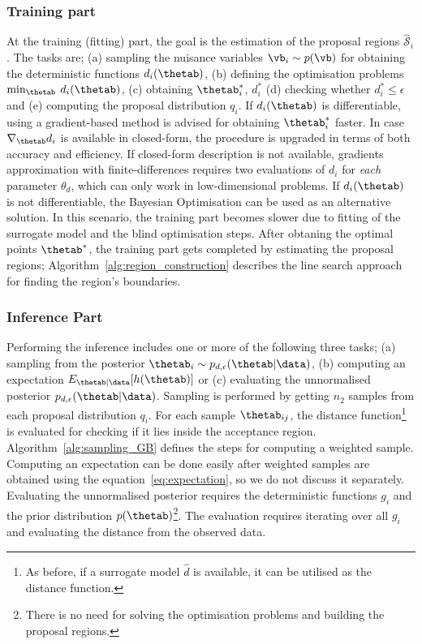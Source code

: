 \subsubsection*{Training part}
\noindent
At the training (fitting) part, the goal is the estimation of the
proposal regions $\mathcal{\hat{S}}_i$. The tasks are; (a) sampling
the nuisance variables $\vb_i \sim p(\vb)$ for obtaining the
deterministic functions $d_i(\thetab)$, (b) defining the optimisation
problems $\min_{\thetab} \: d_i(\thetab)$, (c) obtaining
$\thetab_i^*$, $d_i^*$ (d) checking whether $d_i^* \leq \epsilon$ and
(e) computing the proposal distribution $q_i$. If $d_i(\thetab)$ is
differentiable, using a gradient-based method is advised for obtaining
$\thetab_i^*$ faster. In case $\nabla_{\thetab} d_i$ is available in
closed-form, the procedure is upgraded in terms of both accuracy and
efficiency. If closed-form description is not available, gradients
approximation with finite-differences requires two evaluations of
$d_i$ for \emph{each} parameter $\theta_d$, which can only work in
low-dimensional problems. If $d_i(\thetab)$ is not differentiable, the
Bayesian Optimisation can be used as an alternative solution. In this
scenario, the training part becomes slower due to fitting of the
surrogate model and the blind optimisation steps. After obtaning the
optimal points $\thetab^*$, the training part gets completed by
estimating the proposal regions;
Algorithm~\ref{alg:region_construction} describes the line search
approach for finding the region's boundaries.

\subsubsection*{Inference Part}
Performing the inference includes one or more of the following three
tasks; (a) sampling from the posterior
$ \thetab_i \sim p_{d, \epsilon}(\thetab|\data)$, (b) computing an
expectation $E_{\thetab|\data}[h(\thetab)]$ or (c) evaluating the
unnormalised posterior $p_{d, \epsilon}(\thetab|\data)$. Sampling is
performed by getting $n_2$ samples from each proposal distribution
$q_i$. For each sample $\thetab_{ij}$, the distance
function\footnote{As before, if a surrogate model $\hat{d}$ is
  available, it can be utilised as the distance function.} is
evaluated for checking if it lies inside the acceptance
region. Algorithm~\ref{alg:sampling_GB} defines the steps for
computing a weighted sample. Computing an expectation can be done
easily after weighted samples are obtained using the
equation~\ref{eq:expectation}, so we do not discuss it
separately. Evaluating the unnormalised posterior requires the
deterministic functions $g_i$ and the prior distribution
$p(\thetab)$\footnote{There is no need for solving the optimisation
  problems and building the proposal regions.}. The evaluation
requires iterating over all $g_i$ and evaluating the distance from the
observed data.

